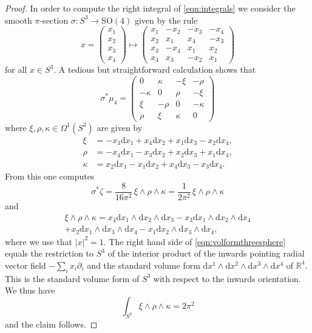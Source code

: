 \documentclass[10pt,a4paper]{amsart}
\newcommand*{\R}{\mathbb{R}}
\newcommand{\col}{:}
\renewcommand*{\d}{\mathrm{d}}
\begin{document}
\begin{proof}
In order to compute the right integral of \eqref{eqn:integrals} we consider the smooth $\pi$-section $\sigma \col S^3 \to \mathrm{SO}(4)$ given by the rule
\[
x=\begin{pmatrix} x_1 \\ x_2 \\ x_3 \\ x_4 \end{pmatrix} \mapsto \begin{pmatrix} x_1 & -x_2 & -x_3 & -x_4 \\ x_2 & x_1 & x_4 & -x_3 \\ x_3 & -x_4 & x_1 & x_2 \\ x_4 & x_3 & -x_2 & x_1 \end{pmatrix}
\]
for all $x \in S^3$. A tedious but straightforward calculation shows that
\[
\sigma^*\mu_4=\begin{pmatrix} 0 & \kappa & -\xi & -\rho  \\ -\kappa & 0 & \rho & -\xi \\ \xi & -\rho & 0 & -\kappa \\ \rho & \xi & \kappa & 0 \end{pmatrix}
\]
where $\xi,\rho,\kappa \in \Omega^1(S^3)$ are given by
\begin{equation}
\begin{aligned}\label{eqn:leftinvariantforms}
\xi&=-x_3\d x_1+x_4\d x_2+x_1\d x_3-x_2 \d x_4,\\
\rho&=-x_4\d x_1-x_3\d x_2+x_2\d x_3+x_1\d x_4,\\
\kappa&=x_2\d x_1-x_1\d x_2+x_4\d x_3-x_3 \d x_4.
\end{aligned}
\end{equation}
From this one computes
\[
\sigma^*\zeta=\frac{8}{16\pi^2}\,\xi\wedge\rho\wedge\kappa=\frac{1}{2\pi^2}\,\xi\wedge\rho\wedge\kappa
\]
and
\begin{multline}\label{eqn:volformthreesphere}
\xi\wedge\rho\wedge \kappa=x_4\d x_1\wedge \d x_2 \wedge \d x_3-x_3\d x_1\wedge\d x_2\wedge \d x_4\\
+x_2\d x_1\wedge \d x_3\wedge \d x_4-x_1\d x_2\wedge \d x_3 \wedge\d x_4,
\end{multline}
where we use that $|x|^2=1$. The right hand side of \eqref{eqn:volformthreesphere} equals the restriction to $S^3$ of the interior product of the inwards pointing radial vector field $-\sum_{i}x_i\partial_i$ and the standard volume form $\d x^1\wedge\d x^2\wedge \d x^3\wedge \d x^4$ of $\R^4$. This is the standard volume form of $S^3$ with respect to the inwards orientation. We thus have
\begin{equation}\label{eqn:volumethresphere}
\int_{S^3}\xi\wedge \rho\wedge \kappa=2\pi^2
\end{equation}
and the claim follows.
\end{proof}
\end{document}
